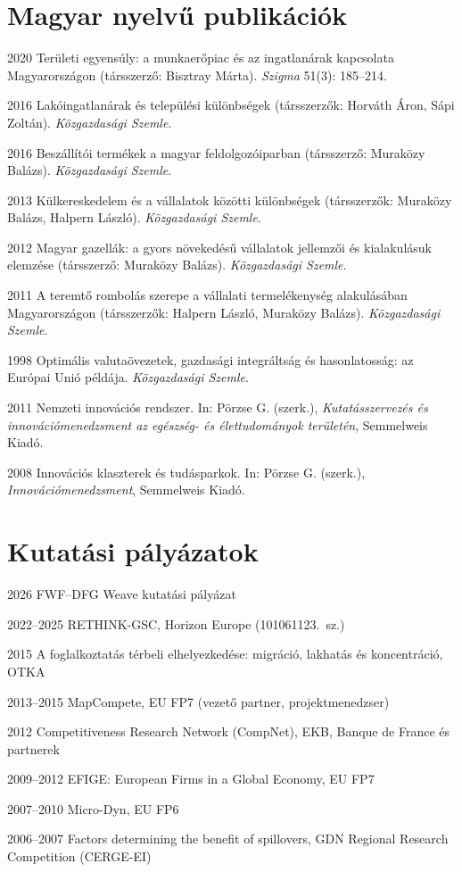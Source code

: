 \documentclass[10pt,a4paper]{article}
\newcommand{\jn}[1]{\textit{#1}}
\begin{document}
\section{Magyar nyelvű publikációk}
\begin{cvlist}
  \item[2020] Területi egyensúly: a munkaerőpiac és az ingatlanárak kapcsolata Magyarországon (társszerző: Bisztray Márta). \jn{Szigma} 51(3): 185--214.
  \item[2016] Lakóingatlanárak és települési különbségek (társszerzők: Horváth Áron, Sápi Zoltán). \jn{Közgazdasági Szemle}.
  \item[2016] Beszállítói termékek a magyar feldolgozóiparban (társszerző: Muraközy Balázs). \jn{Közgazdasági Szemle}.
  \item[2013] Külkereskedelem és a vállalatok közötti különbségek (társszerzők: Muraközy Balázs, Halpern László). \jn{Közgazdasági Szemle}.
  \item[2012] Magyar gazellák: a gyors növekedésű vállalatok jellemzői és kialakulásuk elemzése (társszerző: Muraközy Balázs). \jn{Közgazdasági Szemle}.
  \item[2011] A teremtő rombolás szerepe a vállalati termelékenység alakulásában Magyarországon (társszerzők: Halpern László, Muraközy Balázs). \jn{Közgazdasági Szemle}.
  \item[1998] Optimális valutaövezetek, gazdasági integráltság és hasonlatosság: az Európai Unió példája. \jn{Közgazdasági Szemle}.
  \item[2011] Nemzeti innovációs rendszer. In: Pörzse G. (szerk.), \textit{Kutatásszervezés és innovációmenedzsment az egészség- és élettudományok területén}, Semmelweis Kiadó.
  \item[2008] Innovációs klaszterek és tudásparkok. In: Pörzse G. (szerk.), \textit{Innovációmenedzsment}, Semmelweis Kiadó.
\end{cvlist}

\section{Kutatási pályázatok}
\begin{cvlist}
  \item[2026] FWF--DFG Weave kutatási pályázat
  \item[2022--2025] RETHINK-GSC, Horizon Europe (101061123.~sz.)
  \item[2015] A foglalkoztatás térbeli elhelyezkedése: migráció, lakhatás és koncentráció, OTKA
  \item[2013--2015] MapCompete, EU FP7 (vezető partner, projektmenedzser)
  \item[2012] Competitiveness Research Network (CompNet), EKB, Banque de France és partnerek
  \item[2009--2012] EFIGE: European Firms in a Global Economy, EU FP7
  \item[2007--2010] Micro-Dyn, EU FP6
  \item[2006--2007] Factors determining the benefit of spillovers, GDN Regional Research Competition (CERGE-EI)
\end{cvlist}
\end{document}
